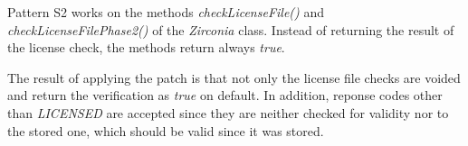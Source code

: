 Pattern S2 works on the methods \textit{checkLicenseFile()} and \textit{checkLicenseFilePhase2()} of the \textit{Zirconia} class.
Instead of returning the result of the license check, the methods return always \textit{true}.
\newline

The result of applying the patch is that not only the license file checks are voided and return the verification as \textit{true} on default.
In addition, reponse codes other than \textit{LICENSED} are accepted since they are neither checked for validity nor to the stored one, which should be valid since it was stored.
